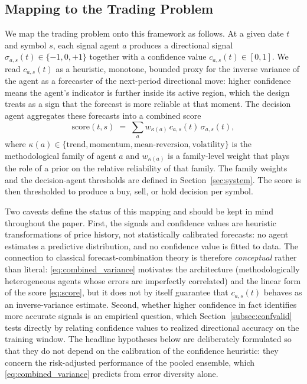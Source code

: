 \documentclass{ieeeaccess}
\begin{document}
\subsection{Mapping to the Trading Problem}

We map the trading problem onto this framework as follows. At a given date $t$ and symbol $s$, each signal agent $a$ produces a directional signal $\sigma_{a,s}(t) \in \{-1, 0, +1\}$ together with a confidence value $c_{a,s}(t) \in [0, 1]$. We read $c_{a,s}(t)$ as a heuristic, monotone, bounded proxy for the inverse variance of the agent as a forecaster of the next-period directional move: higher confidence means the agent's indicator is further inside its active region, which the design treats as a sign that the forecast is more reliable at that moment. The decision agent aggregates these forecasts into a combined score
\begin{equation}
\mathrm{score}(t, s) \;=\; \sum_{a} w_{\kappa(a)} \, c_{a,s}(t) \, \sigma_{a,s}(t),
\label{eq:score}
\end{equation}
where $\kappa(a) \in \{\text{trend}, \text{momentum}, \text{mean-reversion}, \text{volatility}\}$ is the methodological family of agent $a$ and $w_{\kappa(a)}$ is a family-level weight that plays the role of a prior on the relative reliability of that family. The family weights and the decision-agent thresholds are defined in Section~\ref{sec:system}. The score is then thresholded to produce a buy, sell, or hold decision per symbol.

Two caveats define the status of this mapping and should be kept in mind throughout the paper. First, the signals and confidence values are heuristic transformations of price history, not statistically calibrated forecasts: no agent estimates a predictive distribution, and no confidence value is fitted to data. The connection to classical forecast-combination theory is therefore \emph{conceptual} rather than literal: \eqref{eq:combined_variance} motivates the architecture (methodologically heterogeneous agents whose errors are imperfectly correlated) and the linear form of the score \eqref{eq:score}, but it does not by itself guarantee that $c_{a,s}(t)$ behaves as an inverse-variance estimate. Second, whether higher confidence in fact identifies more accurate signals is an empirical question, which Section~\ref{subsec:confvalid} tests directly by relating confidence values to realized directional accuracy on the training window. The headline hypotheses below are deliberately formulated so that they do not depend on the calibration of the confidence heuristic: they concern the risk-adjusted performance of the pooled ensemble, which \eqref{eq:combined_variance} predicts from error diversity alone.
\end{document}
